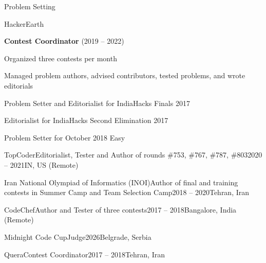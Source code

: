 \begin{section}{Problem Setting}
  \begin{subsection}{HackerEarth}{}{}{}
    \item \textbf{Contest Coordinator} (2019 – 2022)
    \item Organized three contests per month
    \item Managed problem authors, advised contributors, tested problems, and wrote editorials
    \item Problem Setter and Editorialist for IndiaHacks Finals 2017
    \item Editorialist for IndiaHacks Second Elimination 2017
    \item Problem Setter for October 2018 Easy
  \end{subsection}
  \begin{subsection}{TopCoder}{Editorialist, Tester and Author of rounds \#753, \#767, \#787, \#803}{2020 -- 2021}{IN, US (Remote)}
  \end{subsection}
  \begin{subsection}{Iran National Olympiad of Informatics (INOI)}{Author of final and training contests in Summer Camp and Team Selection Camp}{2018 -- 2020}{Tehran, Iran}
  \end{subsection}
  \begin{subsection}{CodeChef}{Author and Tester of three contests}{2017 -- 2018}{Bangalore, India (Remote)}
  \end{subsection}
  
  \begin{subsection}{Midnight Code Cup}{Judge}{2026}{Belgrade, Serbia}
  \end{subsection}


  \begin{subsection}{Quera}{Contest Coordinator}{2017 -- 2018}{Tehran, Iran}
  \end{subsection}
  
\end{section}

